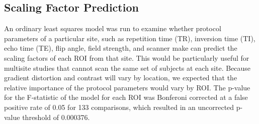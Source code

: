 \subsection{Scaling Factor Prediction}

An ordinary least squares model was run to examine whether protocol parameters of a particular site, such as repetition time (TR), inversion time (TI), echo time (TE), flip angle, field strength, and scanner make can predict the scaling factors of each ROI from that site. This would be particularly useful for multisite studies that cannot scan the same set of subjects at each site. Because gradient distortion and contrast will vary by location, we expected that the relative importance of the protocol parameters would vary by ROI. The p-value for the F-statistic of the model for each ROI was Bonferoni corrected at a false positive rate of 0.05 for 133 comparisons, which resulted in an uncorrected p-value threshold of 0.000376.